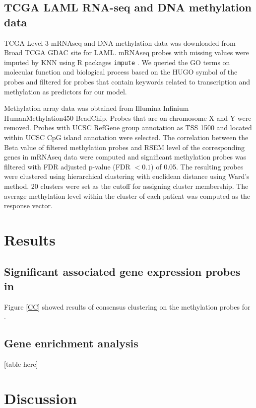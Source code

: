 \documentclass{article}
\begin{document}
\subsection{TCGA LAML RNA-seq and DNA methylation data}
TCGA Level 3 mRNAseq and DNA methylation data was downloaded from Broad TCGA GDAC site for LAML. mRNAseq probes with missing values were imputed by KNN using R packages \texttt{impute} \citep{hastie2001impute}. We queried the GO terms on molecular function and biological process based on the HUGO symbol of the probes and filtered for probes that contain keywords related to transcription and methylation as predictors for our model.   

Methylation array data was obtained from Illumina Infinium HumanMethylation450 BeadChip. Probes that are on chromosome X and Y were removed. Probes with UCSC RefGene group annotation as TSS 1500 and located within UCSC CpG island annotation were selected. The correlation between the Beta value of filtered methylation probes and RSEM level of the corresponding genes in mRNAseq data were computed and significant methylation probes was filtered with FDR adjusted p-value (FDR $< 0.1$) of 0.05. The resulting probes were clustered using hierarchical clustering with euclidean distance using Ward's method. 20 clusters were set as the cutoff for assigning cluster membership. The average methylation level within the cluster of each patient was computed as the response vector. 


\section{Results}

\subsection{Significant associated gene expression probes in \citet{figueroa2010dna}}

Figure \ref{CC} showed results of consensus clustering on the methylation probes for \citet{figueroa2010dna}. 




\subsection{Gene enrichment analysis}
[table here]

\section{Discussion}



\end{document}
